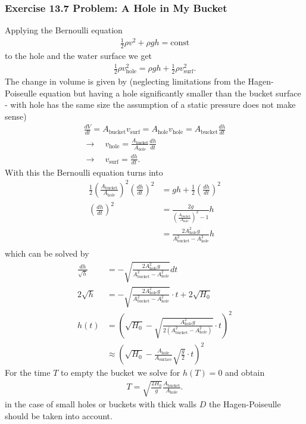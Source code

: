 \documentclass[10pt,a4paper]{article}
\theoremstyle{definition}
\begin{document}
\subsubsection{Exercise 13.7 Problem: A Hole in My Bucket}
Applying the Bernoulli equation 
\begin{align}
    \frac{1}{2}\rho v^2 + \rho g h = \text{const}
\end{align}
to the hole and the water surface we get
\begin{align}
    \frac{1}{2}\rho v_\text{hole}^2 = \rho g h + \frac{1}{2}\rho v_\text{surf}^2.
\end{align}
The change in volume is given by (neglecting limitations from the Hagen-Poiseulle equation but having a hole significantly smaller than the bucket surface - with hole has the same size the assumption of a static pressure does not make sense)
\begin{align}
    \frac{dV}{dt}=A_\text{bucket}v_\text{surf}=A_\text{hole}v_\text{hole}=A_\text{bucket}\frac{dh}{dt}\\
    \rightarrow\quad v_\text{hole}=\frac{A_\text{bucket}}{A_\text{hole}}\frac{dh}{dt}\\
    \rightarrow\quad v_\text{surf}=\frac{dh}{dt}.
\end{align}
With this the Bernoulli equation turns into
\begin{align}
    \frac{1}{2}\left(\frac{A_\text{bucket}}{A_\text{hole}}\right)^2\left(\frac{dh}{dt}\right)^2&=gh+\frac{1}{2}\left(\frac{dh}{dt}\right)^2\\
    \left(\frac{dh}{dt}\right)^2&=\frac{2g}{\left(\frac{A_\text{bucket}}{A_\text{hole}}\right)^2-1}h\\
    &=\frac{2A_\text{hole}^2g}{A_\text{bucket}^2-A_\text{hole}^2}h\\
\end{align}
which can be solved by
\begin{align}
    \frac{dh}{\sqrt{h}}&=-\sqrt{\frac{2A_\text{hole}^2g}{A_\text{bucket}^2-A_\text{hole}^2}}dt\\
    2\sqrt{h}&=-\sqrt{\frac{2A_\text{hole}^2g}{A_\text{bucket}^2-A_\text{hole}^2}}\cdot t+2\sqrt{H_0}\\
    h(t)&=\left(\sqrt{H_0}-\sqrt{\frac{A_\text{hole}^2g}{2(A_\text{bucket}^2-A_\text{hole}^2)}}\cdot t\right)^2\\
    &\approx\left(\sqrt{H_0}-\frac{A_\text{hole}}{A_\text{surface}}\sqrt{\frac{g}{2}}\cdot t\right)^2
\end{align}
For the time $T$ to empty the bucket we solve for $h(T)=0$ and obtain
\begin{align}
    T = \sqrt{\frac{2H_0}{g}}\frac{A_\text{bucket}}{A_\text{hole}}.
\end{align}
in the case of small holes or buckets with thick walls $D$ the Hagen-Poiseulle should be taken into account.
\end{document}
